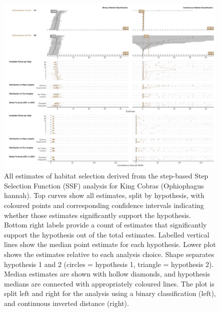 \documentclass[10pt,a4paper]{article}
\begin{document}
\begin{figure}
\includegraphics[width=1\linewidth]{../../figures/specCurve_Ophiophagus hannah_ssf} \caption{All estimates of habitat selection derived from the step-based Step Selection Function (SSF) analysis for King Cobras (Ophiophagus hannah). Top curves show all estimates, split by hypothesis, with coloured points and corresponding confidence intervals indicating whether those estimates significantly support the hypothesis. Bottom right labels provide a count of estimates that significantly support the hypothesis out of the total estimates. Labelled vertical lines show the median point estimate for each hypothesis. Lower plot shows the estimates relative to each analysis choice. Shape separates hypothesis 1 and 2 (circles = hypothesis 1, triangle = hypothesis 2). Median estimates are shown with hollow diamonds, and hypothesis medians are connected with appropriately coloured lines. The plot is split left and right for the analysis using a binary classification (left), and continuous inverted distance (right).}\label{fig:specCurveSsfOPHA}
\end{figure}
\end{document}
